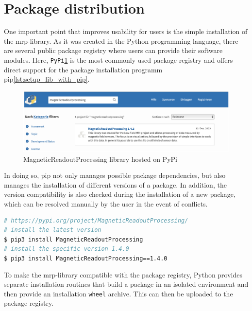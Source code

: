 \hypertarget{package-distribution}{%
\section{Package distribution}\label{package-distribution}}

One important point that improves usability for users is the simple
installation of the \gls{mrp}-library. As it was created in the Python
programming language, there are several public package registry where
users can provide their software modules. Here,
\passthrough{\lstinline!PyPi!}\cite{PyPI}\ref{MagneticReadoutProcessing_library_hosted_on_PyPi.png}\cite{MagneticReadoutProcessingPyPI}
is the most commonly used package registry and offers direct support for
the package installation programm \gls{pip}\ref{lst:setup_lib_with_pip}.

\begin{figure}
\centering
\includegraphics{./generated_images/border_MagneticReadoutProcessing_library_hosted_on_PyPi.png}
\caption{MagneticReadoutProcessing library hosted on PyPi
\label{MagneticReadoutProcessing_library_hosted_on_PyPi.png}}
\end{figure}

In doing so, \gls{pip} not only manages possible package dependencies,
but also manages the installation of different versions of a package. In
addition, the version compatibility is also checked during the
installation of a new package, which can be resolved manually by the
user in the event of conflicts.

\begin{lstlisting}[language=bash, caption={Bash commands to install the MagneticReadoutProcessing (+mrp)-library using pip}, label=lst:setup_lib_with_pip]
# https://pypi.org/project/MagneticReadoutProcessing/
# install the latest version
$ pip3 install MagneticReadoutProcessing
# install the specific version 1.4.0
$ pip3 install MagneticReadoutProcessing==1.4.0
\end{lstlisting}

To make the \gls{mrp}-library compatible with the package registry,
Python provides separate installation routines that build a package in
an isolated environment and then provide an installation
\passthrough{\lstinline!wheel!} archive. This can then be uploaded to
the package registry.

